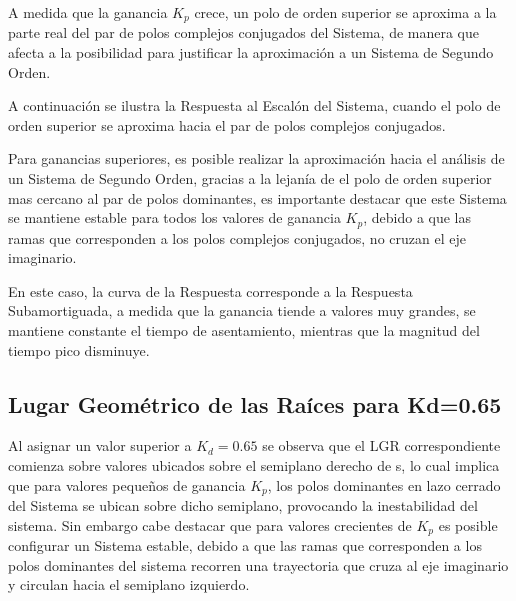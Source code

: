 \documentclass[12pt,letterpaper]{article}
\begin{document}
A medida que la ganancia $K_{p}$ crece, un polo de orden superior se aproxima a la parte real del par de polos complejos conjugados del Sistema, de manera que afecta a la posibilidad para justificar la aproximación a un Sistema de Segundo Orden.

A continuación se ilustra la Respuesta al Escalón del Sistema, cuando el polo de orden superior se aproxima hacia el par de polos complejos conjugados.

\begin{figure}[H]
\centering
{}
\end{figure}

Para ganancias superiores, es posible realizar la aproximación hacia el análisis de un Sistema de Segundo Orden, gracias a la lejanía de el polo de orden superior mas cercano al par de polos dominantes, es importante destacar que este Sistema se mantiene estable para todos los valores de ganancia $K_{p}$, debido a que las ramas que corresponden a los polos complejos conjugados, no cruzan el eje imaginario.

En este caso, la curva de la Respuesta corresponde a la Respuesta Subamortiguada, a medida que la ganancia tiende a valores muy grandes, se mantiene constante el tiempo de asentamiento, mientras que la magnitud del tiempo pico disminuye.

\subsection{Lugar Geométrico de las Raíces para Kd=0.65}
Al asignar un valor superior a $K_{d}=0.65$ se observa que el LGR correspondiente comienza sobre valores ubicados sobre el semiplano derecho de s, lo cual implica que para valores pequeños de ganancia $K_{p}$, los polos dominantes en lazo cerrado del Sistema se ubican sobre dicho semiplano, provocando la inestabilidad del sistema.
Sin embargo cabe destacar que para valores crecientes de $K_{p}$ es posible configurar un Sistema estable, debido a que las ramas que corresponden a los polos dominantes del sistema recorren una trayectoria que cruza al eje imaginario y circulan hacia el semiplano izquierdo. 
\end{document}
